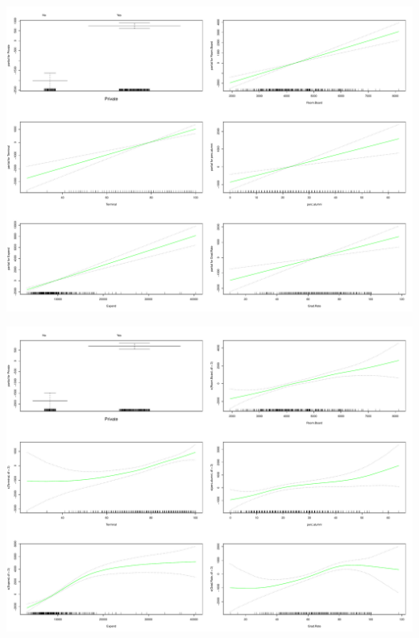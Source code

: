 \documentclass[11pt, a4paper]{article}
\begin{document}
\includegraphics[scale=0.4]{gam_trees_s.pdf}

\includegraphics[scale=0.4]{gam_trees_s_3.pdf}
\end{document}
